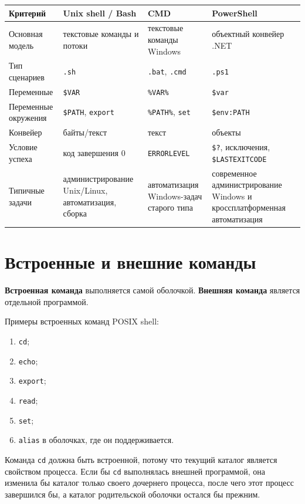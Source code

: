 \documentclass[12pt,a4paper]{article}
\begin{document}
\begin{longtable}{|p{4cm}|p{3.5cm}|p{3.5cm}|p{3.5cm}|}
\hline
Критерий & Unix shell / Bash & CMD & PowerShell \\
\hline
Основная модель & текстовые команды и потоки & текстовые команды Windows & объектный конвейер .NET \\
\hline
Тип сценариев & \texttt{.sh} & \texttt{.bat}, \texttt{.cmd} & \texttt{.ps1} \\
\hline
Переменные & \texttt{\$VAR} & \texttt{\%VAR\%} & \texttt{\$var} \\
\hline
Переменные окружения & \texttt{\$PATH}, \texttt{export} & \texttt{\%PATH\%}, \texttt{set} & \texttt{\$env:PATH} \\
\hline
Конвейер & байты/текст & текст & объекты \\
\hline
Условие успеха & код завершения 0 & \texttt{ERRORLEVEL} & \texttt{\$?}, исключения, \texttt{\$LASTEXITCODE} \\
\hline
Типичные задачи & администрирование Unix/Linux, автоматизация, сборка & автоматизация Windows-задач старого типа & современное администрирование Windows и кроссплатформенная автоматизация \\
\hline
\end{longtable}

\section{Встроенные и внешние команды}

\textbf{Встроенная команда} выполняется самой оболочкой. \textbf{Внешняя команда} является отдельной программой.

Примеры встроенных команд POSIX shell:
\begin{enumerate}
    \item \texttt{cd};
    \item \texttt{echo};
    \item \texttt{export};
    \item \texttt{read};
    \item \texttt{set};
    \item \texttt{alias} в оболочках, где он поддерживается.
\end{enumerate}

Команда \texttt{cd} должна быть встроенной, потому что текущий каталог является свойством процесса. Если бы \texttt{cd} выполнялась внешней программой, она изменила бы каталог только своего дочернего процесса, после чего этот процесс завершился бы, а каталог родительской оболочки остался бы прежним.
\end{document}
